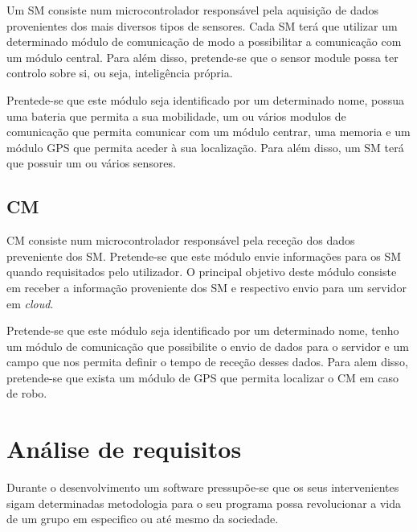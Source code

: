 Um \acl{SM} consiste num microcontrolador responsável pela aquisição de dados provenientes dos mais diversos tipos de sensores. Cada \acl{SM} terá que utilizar um determinado módulo de comunicação de modo a possibilitar a comunicação com um módulo central. Para além disso, pretende-se que o sensor module possa ter controlo sobre si, ou seja, inteligência própria. 

Prentede-se que este módulo seja identificado por um determinado nome, possua uma bateria que permita a sua mobilidade, um ou vários modulos de comunicação que permita comunicar com um módulo centrar, uma memoria e um módulo \ac{GPS} que permita aceder à sua localização. Para além disso, um \acl{SM} terá que possuir um ou vários sensores.  





\subsection{\acl{CM}}



\acl{CM} consiste num microcontrolador responsável pela receção dos dados preveniente dos \acl{SM}. Pretende-se que este módulo envie informações para os \acl{SM} quando requisitados pelo utilizador. O principal objetivo deste módulo consiste em receber a informação proveniente dos \ac{SM} e respectivo envio para um servidor em \textit{cloud}. 

Pretende-se que este módulo seja identificado por um determinado nome, tenho um  módulo de comunicação que possibilite o envio de dados para o servidor e um campo que nos permita definir o tempo de receção desses dados. Para alem disso, pretende-se que exista um módulo de \ac{GPS} que permita localizar o \acl{CM} em caso de robo.
 





\newpage







\section{Análise de requisitos}

Durante o desenvolvimento um software pressupõe-se que os seus intervenientes sigam determinadas metodologia para o seu programa possa revolucionar a vida de um grupo em especifico ou até mesmo da sociedade. 


